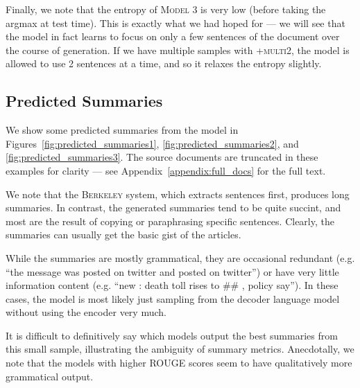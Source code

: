 \documentclass[12pt]{report}
\begin{document}
Finally, we note that the entropy of \textsc{Model 3} is very low (before taking the argmax at test time). This is exactly what we had hoped for --- we will see that the model in fact learns to focus on only a few sentences of the document over the course of generation. If we have multiple samples with \textsc{+multi2}, the model is allowed to use 2 sentences at a time, and so it relaxes the entropy slightly.




\subsection{Predicted Summaries}
We show some predicted summaries from the model in Figures~\ref{fig:predicted_summaries1}, \ref{fig:predicted_summaries2}, and \ref{fig:predicted_summaries3}.
The source documents are truncated in these examples for clarity --- see Appendix~\ref{appendix:full_docs} for the full text.

We note that the \textsc{Berkeley} system, which extracts sentences first, produces long summaries. In contrast, the generated summaries tend to be quite succint, and most are the result of copying or paraphrasing specific sentences. Clearly, the summaries can usually get the basic gist of the articles. 

While the summaries are mostly grammatical, they are occasional redundant (e.g. ``the message was posted on twitter and posted on twitter'') or have very little information content (e.g. ``new : death toll rises to \#\# , policy say''). In these cases, the model is most likely just sampling from the decoder language model without using the encoder very much.

It is difficult to definitively say which models output the best summaries from this small sample, illustrating the ambiguity of summary metrics. Anecdotally, we note that the models with higher ROUGE scores seem to have qualitatively more grammatical output.
\end{document}
